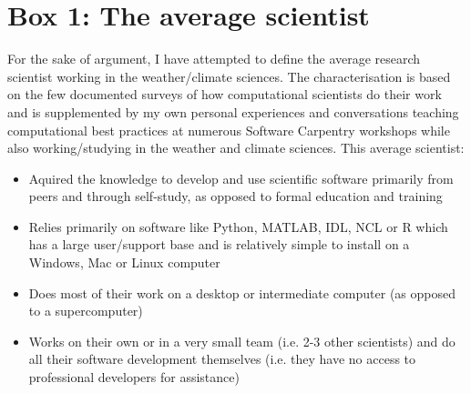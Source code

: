 \section*{Box 1: The average scientist}

For the sake of argument, I have attempted to define the average research scientist working in the weather/climate sciences. The characterisation is based on the few documented surveys of how computational scientists do their work \citep{Hannay2009,Stodden2010} and is supplemented by my own personal experiences and conversations teaching computational best practices at numerous Software Carpentry workshops while also working/studying in the weather and climate sciences. This average scientist:
\begin{itemize}
\item Aquired the knowledge to develop and use scientific software primarily from peers and through self-study, as opposed to formal education and training
\item Relies primarily on software like Python, MATLAB, IDL, NCL or R which has a large user/support base and is relatively simple to install on a Windows, Mac or Linux computer
\item Does most of their work on a desktop or intermediate computer (as opposed to a supercomputer)
\item Works on their own or in a very small team (i.e. 2-3 other scientists) and do all their software development themselves (i.e. they have no access to professional developers for assistance) 
\end{itemize}





